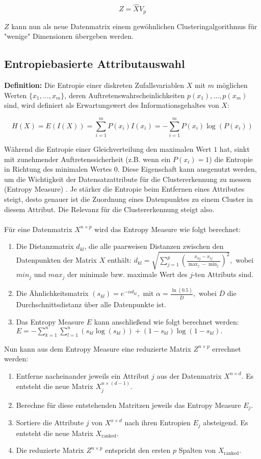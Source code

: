\documentclass[11pt,ceqn]{book}
\begin{document}
$$Z = \hat{X} V_p$$ 

$Z$ kann nun als neue Datenmatrix einem gewöhnlichen Clusteringalgorithmus für "wenige" Dimensionen übergeben werden.

\subsection{Entropiebasierte Attributauswahl}
\textbf{Definition:} Die Entropie einer diskreten Zufallsvariablen $X$ mit $m$ möglichen Werten $\{x_1,\dots,x_m\}$, deren Auftretenswahrscheinlichkeiten $p(x_1),\dots,p(x_m)$ sind, wird definiert als Erwartungswert des Informationsgehaltes von $X$:

$$H(X)= E(I(X)) = \sum\limits_{i=1}^m P(x_i)I(x_i)=-\sum\limits_{i=1}^m P(x_i)\log(P(x_i))$$

Während die Entropie einer Gleichverteilung den maximalen Wert $1$ hat, sinkt mit zunehmender Auftretenssicherheit (z.B. wenn ein $P(x_i)=1$) die Entropie in Richtung des minimalen Wertes $0$. Diese Eigenschaft kann ausgenutzt werden, um die Wichtigkeit der Datensatzattribute für die Clustererkennung zu messen (Entropy Measure) \cite{ebdimred}. Je stärker die Entropie beim Entfernen eines Attributes steigt, desto genauer ist die Zuordnung eines Datenpunktes zu einem Cluster in diesem Attribut. Die Relevanz für die Clustererkennung steigt also. 
\\~\\
Für eine Datenmatrix $X^{n\times p}$ wird das Entropy Measure wie folgt berechnet:

\begin{enumerate}
\item Die Distanzmatrix $d_{kl}$, die alle paarweisen Distanzen zwischen den Datenpunkten der Matrix $X$ enthält: $d_{kl} = \sqrt{\sum\limits_{j=1}^p \left(\frac{x_{kj}-x_{lj}}{\max_j-\min_j}\right)^2},$ wobei $min_j$ und $max_j$ der minimale bzw. maximale Wert des $j$-ten Attributs sind.
\item Die Ähnlichkeitsmatrix $(s_{kl}) = e^{-\alpha d_{kl}}, \text{ mit } \alpha = \frac{\ln(0.5)}{\overline{D}},$ wobei $\overline{D}$ die Durchschnittsdistanz über alle Datenpunkte ist.
\item Das Entropy Measure $E$ kann anschließend wie folgt berechnet werden: $E = - \sum\limits_{k=1}^n \sum\limits_{l=1}^n (s_{kl}\log(s_{kl}))+(1-s_{kl})\log(1-s_{kl}).$
\end{enumerate}
Nun kann aus dem Entropy Measure eine reduzierte Matrix $Z^{n\times p}$ errechnet werden:
\begin{enumerate}
\item Entferne nacheinander jeweils ein Attribut $j$ aus der Datenmatrix $X^{n\times d}$. Es entsteht die neue Matrix $X_j^{n\times(d-1)}$.
\item Berechne für diese entstehenden Matritzen jeweils das Entropy Measure $E_j$.
\item Sortiere die Attribute $j$ von $X^{x\times d}$ nach ihren Entropien $E_j$ absteigend. Es entsteht die neue Matrix $X_{\text{ranked}}$.
\item Die reduzierte Matrix $Z^{n\times p}$ entspricht den ersten $p$ Spalten von $X_\text{ranked}$.
\end{enumerate}
\end{document}
